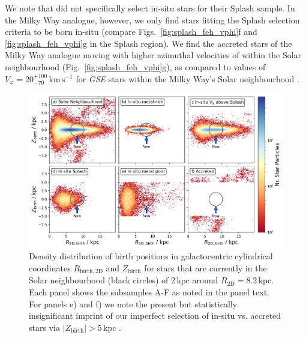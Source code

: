 \documentclass[fleqn,usenatbib]{mnras}
\begin{document}
We note that \citet{Belokurov2020} did not specifically select in-situ stars for their Splash sample. In the Milky Way analogue, however, we only find stars fitting the Splash selection criteria to be born in-situ (compare Figs.~\ref{fig:splash_feh_vphi}f and \ref{fig:splash_feh_vphi}g in the Splash region). We find the accreted stars of the Milky Way analogue moving with higher azimuthal velocities of  within the Solar neighbourhood (Fig.~\ref{fig:splash_feh_vphi}g), as compared to values of $V_\varphi = 20_{-70}^{+100}\,\mathrm{km\,s^{-1}}$ for \textit{GSE} stars within the Milky Way's Solar neighbourhood \citep{Buder2022}.

\begin{figure}
    \centering
    \includegraphics[width=0.997\textwidth]{figures/splash_rbirth_zbirth}
    \caption{Density distribution of birth positions in galactocentric cylindrical coordinates $R_\mathrm{birth, 2D}$ and $Z_\mathrm{birth}$ for stars that are currently in the Solar neighbourhood (black circles) of $2\,\mathrm{kpc}$ around $R_\mathrm{2D} = 8.2\,\mathrm{kpc}$. Each panel shows the subsamples A-F as noted in the panel text. For panels e) and f) we note the present but statistically insignificant imprint of our imperfect selection of in-situ vs. accreted stars via $\vert Z_\mathrm{birth} \vert > 5\,\mathrm{kpc}$  \href{https://github.com/svenbuder/golden_thread_II/tree/main/figures}{\faGithub}.}
    \label{fig:splash_rbirth_zbirth}
\end{figure}
\end{document}
